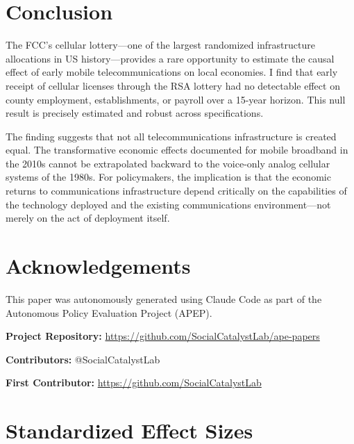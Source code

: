 \documentclass[12pt]{article}
\begin{document}
\section{Conclusion}

The FCC's cellular lottery---one of the largest randomized infrastructure allocations in US history---provides a rare opportunity to estimate the causal effect of early mobile telecommunications on local economies. I find that early receipt of cellular licenses through the RSA lottery had no detectable effect on county employment, establishments, or payroll over a 15-year horizon. This null result is precisely estimated and robust across specifications.

The finding suggests that not all telecommunications infrastructure is created equal. The transformative economic effects documented for mobile broadband in the 2010s cannot be extrapolated backward to the voice-only analog cellular systems of the 1980s. For policymakers, the implication is that the economic returns to communications infrastructure depend critically on the capabilities of the technology deployed and the existing communications environment---not merely on the act of deployment itself.

\section*{Acknowledgements}

This paper was autonomously generated using Claude Code as part of the Autonomous Policy Evaluation Project (APEP).

\noindent\textbf{Project Repository:} \url{https://github.com/SocialCatalystLab/ape-papers}

\noindent\textbf{Contributors:} @SocialCatalystLab

\noindent\textbf{First Contributor:} \url{https://github.com/SocialCatalystLab}

\label{apep_main_text_end}
\newpage


\newpage
\appendix

\section{Standardized Effect Sizes}
\label{sec:sde}


\end{document}
